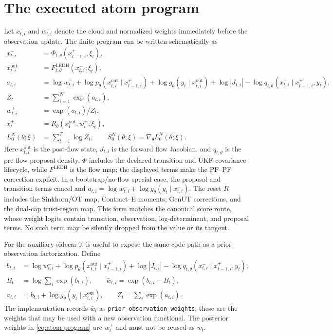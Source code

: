 \documentclass[11pt]{article}
\newcommand{\GenUT}{\ensuremath{\mathrm{GenUT}}}
\newcommand{\OT}{\ensuremath{\mathrm{OT}}}
\begin{document}
\section{The executed atom program}

Let $x_{t,i}^{-}$ and $w_{t,i}^{-}$ denote the cloud and normalized weights
immediately before the observation update.  The finite program can be written
schematically as
\begin{align}
 x_{t,i}^{-}
   &= \Phi_{t,\theta}(x_{t-1,i}^{+},\xi_t), \\
 x_{t,i}^{\mathrm{out}}
   &= F_{t,\theta}^{\mathrm{LEDH}}(x_{t,i}^{-};\xi_t), \\
 a_{t,i}
   &= \log w_{t,i}^{-}
      +\log p_\theta(x_{t,i}^{\mathrm{out}}\mid x_{t-1,i}^{+})
      +\log g_\theta(y_t\mid x_{t,i}^{\mathrm{out}})
      +\log |J_{t,i}|
      -\log q_{t,\theta}(x_{t,i}^{-}\mid x_{t-1,i}^{+},y_t), \\
 Z_t
   &= \sum_{i=1}^{N}\exp(a_{t,i}), \\
 w_{t,i}^{+}
   &= \exp(a_{t,i})/Z_t, \\
 x_t^{+}
   &= R_\theta(x_t^{\mathrm{out}},w_t^{+};\xi_t), \label{eq:atom-program}\\
 L_0^N(\theta;\xi)
   &= \sum_{t=1}^{T}\log Z_t,\qquad
 S_0^N(\theta;\xi)=\nabla_\theta L_0^N(\theta;\xi).
\end{align}
Here $x_{t,i}^{\mathrm{out}}$ is the post-flow state, $J_{t,i}$ is the
forward flow Jacobian, and $q_{t,\theta}$ is the pre-flow proposal density.
$\Phi$ includes the declared transition and UKF covariance lifecycle, while
$F^{\mathrm{LEDH}}$ is the flow map; the displayed terms make the PF--PF
correction explicit.  In a
bootstrap/no-flow special case, the proposal and transition terms cancel and
$a_{t,i}=\log w_{t,i}^{-}+\log g_\theta(y_t\mid x_{t,i}^{-})$.  The reset $R$
includes the Sinkhorn/\OT{} map, Contract--E moments, \GenUT{} corrections,
and the dual-cap trust-region map.  This form matches the canonical score
route, whose weight logits contain transition, observation, log-determinant,
and proposal terms.  No such term may be silently dropped from the value or
its tangent.

For the auxiliary sidecar it is useful to expose the same code path as a
prior-observation factorization.  Define
\begin{align}
 b_{t,i} &= \log w_{t,i}^{-}
      +\log p_\theta(x_{t,i}^{\mathrm{out}}\mid x_{t-1,i}^{+})
      +\log |J_{t,i}|
      -\log q_{t,\theta}(x_{t,i}^{-}\mid x_{t-1,i}^{+},y_t),\\
 B_t &= \log\sum_i\exp(b_{t,i}),\qquad
 \bar w_{t,i}=\exp(b_{t,i}-B_t),\\
 a_{t,i} &= b_{t,i}+\log g_\theta(y_t\mid x_{t,i}^{\mathrm{out}}),\qquad
 Z_t=\sum_i\exp(a_{t,i}).
 \label{eq:prior-observation-factorization}
\end{align}
The implementation records $\bar w_t$ as
\texttt{prior\_observation\_weights}; these are the weights that may be
used with a new observation functional.  The posterior weights in
\eqref{eq:atom-program} are $w_t^+$ and must not be reused as $\bar w_t$.
\end{document}
